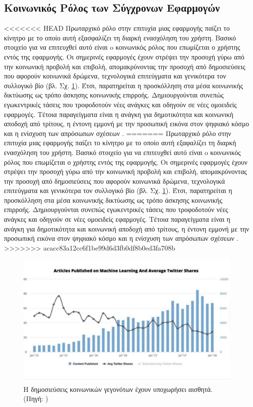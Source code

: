 \subsection{Κοινωνικός Ρόλος των Σύγχρονων Εφαρμογών}
<<<<<<< HEAD
Πρωταρχικό ρόλο στην επιτυχία μιας εφαρμογής παίζει το κίνητρο με το οποίο αυτή εξασφαλίζει τη διαρκή ενασχόληση του χρήστη. Βασικό στοιχείο για να επιτευχθεί αυτό είναι o κοινωνικός ρόλος που επωμίζεται ο χρήστης εντός της εφαρμογής. Oι σημερινές εφαρμογές έχουν στρέψει την προσοχή γύρω από την κοινωνική προβολή και επιβολή, απομακρύνοντας την προσοχή από δημοσιεύσεις που αφορούν κοινωνικά δρώμενα, τεχνολογικά επιτεύγματα και γενικότερα τον συλλογικό βίο (βλ. Σχ. \ref{socialsharing}). Έτσι, παρατηρείται η προσκόλληση στα μέσα κοινωνικής δικτύωσης ως τρόπο άσκησης κοινωνικής επιρροής. Δημιουργούνται συνεπώς εγωκεντρικές τάσεις που τροφοδοτούν νέες ανάγκες και οδηγούν σε νέες ομοειδείς εφαρμογές. Τέτοια παραγείγματα είναι η ανάγκη για δημοτικότητα και κοινωνική αποδοχή \cite{[IND+16]} από τρίτους, η έντονη εμμονή με την προσωπική εικόνα στον ψηφιακό κόσμο και η ενίσχυση των απρόσωπων σχέσεων \cite{[JAR+18]}. 
=======
Πρωταρχικό ρόλο στην επιτυχία μιας εφαρμογής παίζει το κίνητρο με το οποίο αυτή εξαφαλίζει τη διαρκή ενασχόληση του χρήστη. Βασικό στοιχείο για να επιτευχθεί αυτό είναι o κοινωνικός ρόλος που επωμίζεται ο χρήστης εντός της εφαρμογής. Oι σημερινές εφαρμογές έχουν στρέψει την προσοχή γύρω από την κοινωνική προβολή και επιβολή, απομακρύνοντας την προσοχή από δημοσιεύσεις που αφορούν κοινωνικά δρώμενα, τεχνολογικά επιτεύγματα και γενικότερα τον συλλογικό βίο (βλ. Σχ. \ref{socialsharing}). Έτσι, παρατηρείται η προσκόλληση στα μέσα κοινωνικής δικτύωσης ως τρόπο άσκησης κοινωνικής επιρροής. Δημιουργούνται συνεπώς εγωκεντρικές τάσεις που τροφοδοτούν νέες ανάγκες και οδηγούν σε νέες ομοειδείς εφαρμογές. Τέτοια παραγείγματα είναι η ανάγκη για δημοτικότητα και κοινωνική αποδοχή \cite{[IND+16]} από τρίτους, η έντονη εμμονή με την προσωπική εικόνα στον ψηφιακό κόσμο και η ενίσχυση των απρόσωπων σχέσεων \cite{[JAR+18]}. 
>>>>>>> acacc83a12cc6f1be99d6d3fb0df8b0ed3fa708b

\begin{figure}[H]
    \includegraphics[scale=0.3]{figures/social-share-has-decreased.png}
    \centering
    \caption{Η δημοσιεύσεις κοινωνικών γεγονότων έχουν υποχωρήσει αισθητά. (Πηγή: \cite{[VEN+18]})}
    \label{socialsharing}
\end{figure}


